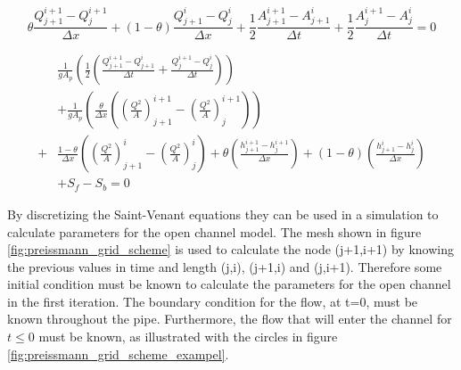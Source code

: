 \begin{equation}\label{eq:continuity_eq_preissmann}
    \theta \frac{Q_{j+1}^{i+1}-Q_j^{i+1}}{\Delta x}+(1-\theta)\frac{Q_{j+1}^i - Q_j^i}{\Delta x}+
    \frac{1}{2}\frac{A_{j+1}^{i+1}-A_{j+1}^i}{\Delta t} + \frac{1}{2} \frac{A_{j}^{i+1} - A_j^i}{\Delta t} = 0
\end{equation}

\begin{equation}\label{eq:Momentum_eq_preissmann_discrete}
\begin{aligned}
    &\frac{1}{gA_p}\left(\frac{1}{2} \left(\frac{Q_{j+1}^{i+1}-Q_{j+1}^i}{\Delta t}+\frac{Q_{j}^{i+1} - Q_j^i}{\Delta t}\right)\right)\\ &+ \frac{1}{gA_p}\left(\frac{\theta}{\Delta x} \left(\left(\frac{Q^2}{A}\right)_{j+1}^{i+1}-\left(\frac{Q^2}{A}\right)_{j}^{i+1}\right)\right) \\+  &\frac{1-\theta}{\Delta x}\left(\left(\frac{Q^2}{A}\right)_{j+1}^{i}-\left(\frac{Q^2}{A}\right)_{j}^{i}\right)+\theta \left(\frac{h_{j+1}^{i+1}-h_j^{i+1}}{\Delta x}\right)+ (1-\theta)\left(\frac{h_{j+1}^{i} - h_j^i}{\Delta x}\right)\\&+S_f-S_b= 0
    \end{aligned}
\end{equation}

By discretizing the Saint-Venant equations they can be used in a simulation to calculate parameters for the open channel model. The mesh shown in figure \ref{fig:preissmann_grid_scheme} is used to calculate the node (j+1,i+1) by knowing the previous values in time and length (j,i), (j+1,i) and (j,i+1). Therefore some initial condition must be known to calculate the parameters for the open channel in the first iteration. The boundary condition for the flow, at t=0, must be known throughout the pipe. Furthermore, the flow that will enter the channel for $t\leq 0$ must be known, as illustrated with the circles in figure \ref{fig:preissmann_grid_scheme_exampel}.

